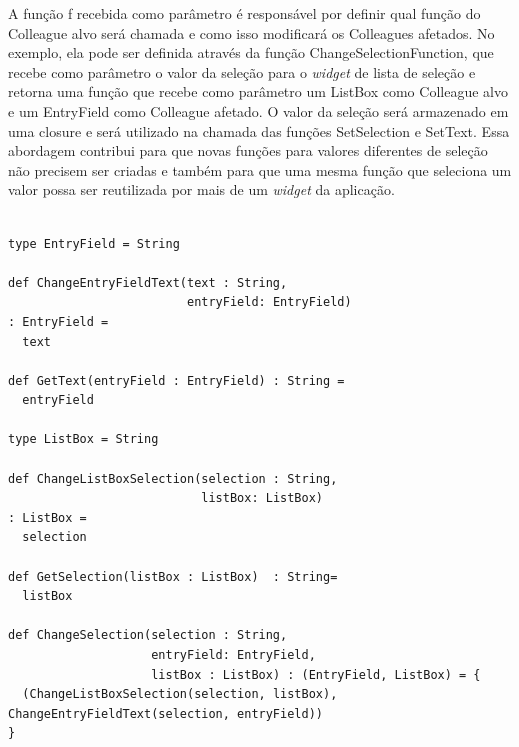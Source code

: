 A função f recebida como parâmetro é responsável por 
definir qual função do Colleague alvo será chamada e 
como isso modificará os Colleagues afetados. No exemplo, 
ela pode ser definida através da função ChangeSelectionFunction, 
que recebe como parâmetro o valor da seleção para o \textit{widget} 
de lista de seleção e retorna uma função que recebe como parâmetro 
um ListBox como Colleague alvo e um EntryField como 
Colleague afetado. O valor da seleção será armazenado 
em uma closure e será utilizado na chamada das funções 
SetSelection e SetText. Essa abordagem contribui 
para que novas funções para valores diferentes de 
seleção não precisem ser criadas e também para que 
uma mesma função que seleciona um valor possa ser 
reutilizada por mais de um \textit{widget} da aplicação.

\begin{lstlisting}[caption={Mediator Funcional},label=fpmediator]
    
type EntryField = String

def ChangeEntryFieldText(text : String,
						 entryField: EntryField)
: EntryField =
  text
  
def GetText(entryField : EntryField) : String =
  entryField
  
type ListBox = String
  
def ChangeListBoxSelection(selection : String,
						   listBox: ListBox)
: ListBox =
  selection
  
def GetSelection(listBox : ListBox)  : String=
  listBox
  
def ChangeSelection(selection : String,
					entryField: EntryField,
					listBox : ListBox) : (EntryField, ListBox) = {
  (ChangeListBoxSelection(selection, listBox), ChangeEntryFieldText(selection, entryField))
}
	    
\end{lstlisting}